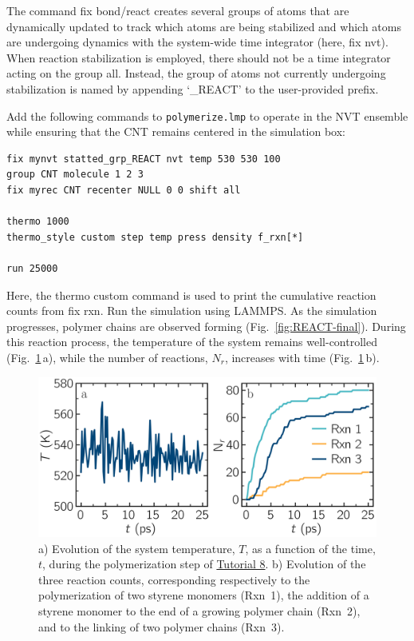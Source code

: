 \documentclass[9pt,tutorial]{livecoms}
\newcommand{\lmpcmd}[1]{\colorbox{listing}{\textcolor{command}{\small{#1}}}} %
\newcommand{\flecmd}[1]{\textcolor{command}{\texttt{#1}}} %
\begin{document}
\begin{note}
The command \lmpcmd{fix bond/react} creates several groups of atoms that are dynamically updated
to track which atoms are being stabilized and which atoms are undergoing
dynamics with the system-wide time integrator (here, \lmpcmd{fix nvt}).
When reaction stabilization is employed, there should not be a time integrator acting on
the group \mbox{\lmpcmd{all}.}  Instead, the group of atoms not currently
undergoing stabilization is named by appending `\_REACT' to the user-provided prefix.
\end{note}

Add the following commands to \flecmd{polymerize.lmp} to operate in the NVT ensemble
while ensuring that the CNT remains centered in the simulation box:
\begin{lstlisting}
fix mynvt statted_grp_REACT nvt temp 530 530 100
group CNT molecule 1 2 3
fix myrec CNT recenter NULL 0 0 shift all

thermo 1000
thermo_style custom step temp press density f_rxn[*]

run 25000
\end{lstlisting}
Here, the \lmpcmd{thermo custom} command is used
to print the cumulative reaction counts from \lmpcmd{fix rxn}.
Run the simulation using LAMMPS.  As the simulation progresses, polymer chains are
observed forming (Fig.~\ref{fig:REACT-final}).  During this reaction process, the
temperature of the system remains well-controlled (Fig.~\ref{fig:evolution-reacting}\,a),
while the number of reactions, $N_r$, increases with time (Fig.~\ref{fig:evolution-reacting}\,b).

\begin{figure}
\centering
\includegraphics[width=\linewidth]{REACT-reacting}
\caption{a) Evolution of the system temperature, $T$,
as a function of the time, $t$, during the polymerization step of
\hyperref[bond-react-label]{Tutorial 8}.
b) Evolution of the three reaction counts, corresponding respectively to
the polymerization of two styrene monomers (Rxn~1), the  addition of a styrene
monomer to the end of a growing polymer chain (Rxn~2), and to the linking
of two polymer chains (Rxn~3).}
\label{fig:evolution-reacting}
\end{figure}
\end{document}
